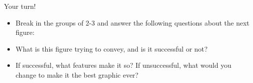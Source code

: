 \documentclass[
  ignorenonframetext,
]{beamer}
\providecommand{\tightlist}{%
  \setlength{\itemsep}{0pt}\setlength{\parskip}{0pt}}
\begin{document}
\begin{frame}{}
\label{section-30}
\end{frame}

\begin{frame}{}
\label{section-31}
\end{frame}

\begin{frame}{Your turn!}
\label{your-turn}
\begin{itemize}
\tightlist
\item
  Break in the groups of 2-3 and answer the following questions about
  the next figure:
\end{itemize}

\begin{itemize}
  \item What is this figure trying to convey, and is it successful or not?
  \item If successful, what features make it so?  If unsuccessful, what would you change to make it the best graphic ever?
\end{itemize}
\end{frame}
\end{document}
